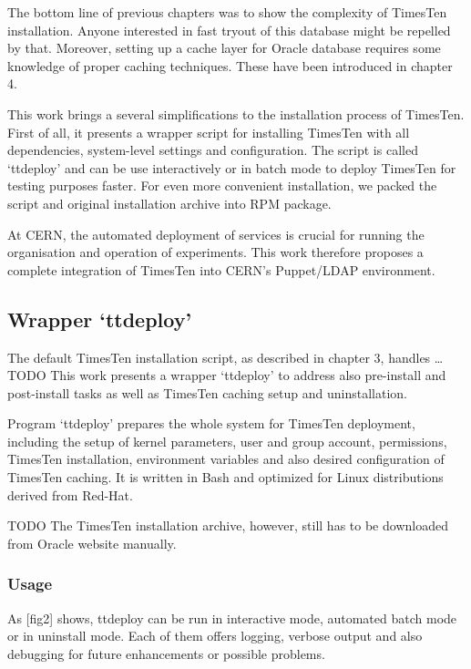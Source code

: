 \documentclass[11pt, letterpaper]{article}            %
\begin{document}
The bottom line of previous chapters was to show the complexity of TimesTen installation. Anyone interested in fast tryout of this database might be repelled by that. Moreover, setting up a cache layer for Oracle database requires some knowledge of proper caching techniques. These have been introduced in chapter 4.

This work brings a several simplifications to the installation process of TimesTen. First of all, it presents a wrapper script for installing TimesTen with all dependencies, system-level settings and configuration. The script is called ‘ttdeploy’ and can be use interactively or in batch mode to deploy TimesTen for testing purposes faster. For even more convenient installation, we packed the script and original installation archive into RPM package.

At CERN, the automated deployment of services is crucial for running the organisation and operation of experiments.  This work therefore proposes a complete integration of TimesTen into CERN’s Puppet/LDAP environment.

\subsection{Wrapper ‘ttdeploy’}

The default TimesTen installation script, as described in chapter 3, handles … TODO This work presents a wrapper ‘ttdeploy’ to address also pre-install and post-install tasks as well as TimesTen caching setup and uninstallation.

Program ‘ttdeploy’ prepares the whole system for TimesTen deployment, including the setup of kernel parameters, user and group account, permissions, TimesTen installation, environment variables and also desired configuration of TimesTen caching. It is written in Bash and optimized for Linux distributions derived from Red-Hat.

TODO The TimesTen installation archive, however, still has to be downloaded from Oracle website manually.

\subsubsection{Usage}

As [fig2] shows, ttdeploy can be run in interactive mode, automated batch mode or in uninstall mode. Each of them offers logging, verbose output and also debugging for future enhancements or possible problems.
\end{document}
